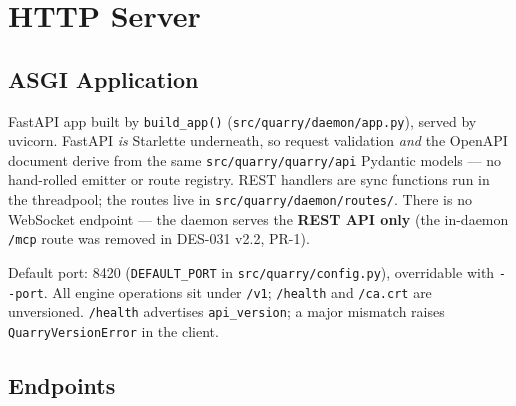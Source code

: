 \documentclass[a4paper,10pt]{article}
\newcommand{\modpath}[1]{\texttt{src/quarry/#1}}
\newcommand{\field}[1]{\texttt{#1}}
\begin{document}
\section{HTTP Server}

\subsection{ASGI Application}

FastAPI app built by \texttt{build\_app()} (\modpath{daemon/app.py}),
served by uvicorn.  FastAPI \emph{is} Starlette underneath, so request
validation \emph{and} the OpenAPI document derive from the same
\modpath{quarry/api} Pydantic models --- no hand-rolled emitter or route
registry.  REST handlers are sync functions run in the threadpool; the
routes live in \modpath{daemon/routes/}.  There is no WebSocket endpoint
--- the daemon serves the \textbf{REST API only} (the in-daemon
\texttt{/mcp} route was removed in DES-031 v2.2, PR-1).

Default port: 8420 (\texttt{DEFAULT\_PORT} in \modpath{config.py}),
overridable with \texttt{-{}-port}.  All engine operations sit under
\texttt{/v1}; \texttt{/health} and \texttt{/ca.crt} are unversioned.
\texttt{/health} advertises \field{api\_version}; a major mismatch
raises \texttt{QuarryVersionError} in the client.

\subsection{Endpoints}
\end{document}
